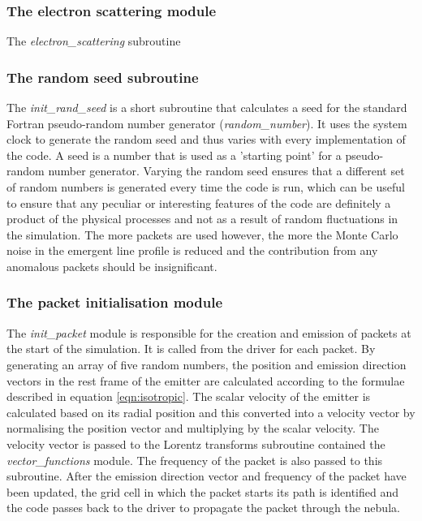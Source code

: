 		\subsubsection{The electron scattering module}
		The \textit{electron\_scattering} subroutine  %
		
		\subsubsection{The random seed subroutine}
		The \textit{init\_rand\_seed} is a short subroutine that calculates a seed for the standard Fortran pseudo-random number generator (\textit{random\_number}).  It uses the system clock to generate the random seed and thus varies with every implementation of the code.  A seed is a number that is used as a 'starting point' for a pseudo-random number generator.  Varying the random seed ensures that a different set of random numbers is generated every time the code is run, which can be useful to ensure that any peculiar or interesting features of the code are definitely a product of the physical processes and not as a result of random fluctuations in the simulation.  The more packets are used however, the more the Monte Carlo noise in the emergent line profile is reduced and the contribution from any anomalous packets should be insignificant.
		
		\subsubsection{The packet initialisation module}
		The \textit{init\_packet} module is responsible for the creation and emission of packets at the start of the simulation.  It is called from the driver for each packet.  By generating an array of five random numbers, the position and emission direction vectors in the rest frame of the emitter are calculated according to the formulae described in equation \ref{eqn:isotropic}.  The scalar velocity of the emitter is calculated based on its radial position and this converted into a velocity vector by normalising the position vector and multiplying by the scalar velocity.  The velocity vector is passed to the Lorentz transforms subroutine contained the \textit{vector\_functions}  module.  The frequency of the packet is also passed to this subroutine.  After the emission direction vector and frequency of the packet have been updated, the grid cell in which the packet starts its path is identified and the code passes back to the driver to propagate the packet through the nebula.
		
